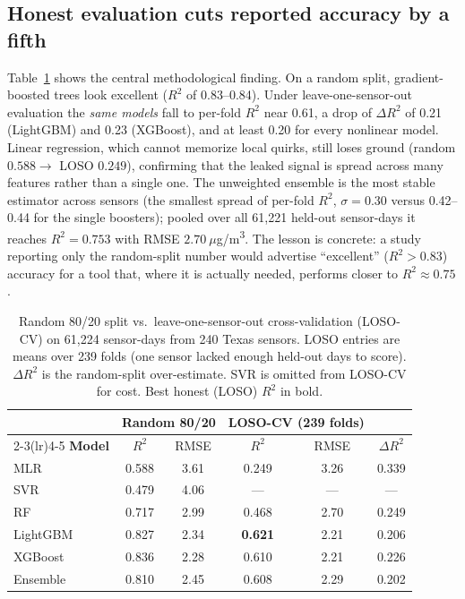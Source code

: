 \documentclass{article}
\begin{document}
\subsection{Honest evaluation cuts reported accuracy by a fifth}
Table~\ref{tab:bench} shows the central methodological finding. On a random split, gradient-boosted trees look excellent ($R^2$ of 0.83--0.84). Under leave-one-sensor-out evaluation the \emph{same models} fall to per-fold $R^2$ near 0.61, a drop of $\Delta R^2$ of 0.21 (LightGBM) and 0.23 (XGBoost), and at least 0.20 for every nonlinear model. Linear regression, which cannot memorize local quirks, still loses ground (random $0.588 \rightarrow$ LOSO $0.249$), confirming that the leaked signal is spread across many features rather than a single one. The unweighted ensemble is the most stable estimator across sensors (the smallest spread of per-fold $R^2$, $\sigma{=}0.30$ versus 0.42--0.44 for the single boosters); pooled over all 61{,}221 held-out sensor-days it reaches $R^2{=}0.753$ with RMSE $2.70~\mu$g/m\textsuperscript{3}. The lesson is concrete: a study reporting only the random-split number would advertise ``excellent'' ($R^2{>}0.83$) accuracy for a tool that, where it is actually needed, performs closer to $R^2 \approx 0.75$.

\begin{table}[t]
\caption{Random 80/20 split vs.\ leave-one-sensor-out cross-validation (LOSO-CV) on 61{,}224 sensor-days from 240 Texas sensors. LOSO entries are means over 239 folds (one sensor lacked enough held-out days to score). $\Delta R^2$ is the random-split over-estimate. SVR is omitted from LOSO-CV for cost. Best honest (LOSO) $R^2$ in bold.}
\label{tab:bench}
\centering
\small
\setlength{\tabcolsep}{6pt}
\begin{tabular}{lccccc}
\toprule
& \multicolumn{2}{c}{\textbf{Random 80/20}} & \multicolumn{2}{c}{\textbf{LOSO-CV (239 folds)}} & \\
\cmidrule(lr){2-3}\cmidrule(lr){4-5}
\textbf{Model} & $R^2$ & RMSE & $R^2$ & RMSE & $\Delta R^2$ \\
\midrule
MLR       & 0.588 & 3.61 & 0.249 & 3.26 & 0.339 \\
SVR       & 0.479 & 4.06 & ---   & ---  & ---   \\
RF        & 0.717 & 2.99 & 0.468 & 2.70 & 0.249 \\
LightGBM  & 0.827 & 2.34 & \textbf{0.621} & 2.21 & 0.206 \\
XGBoost   & 0.836 & 2.28 & 0.610 & 2.21 & 0.226 \\
Ensemble  & 0.810 & 2.45 & 0.608 & 2.29 & 0.202 \\
\bottomrule
\end{tabular}
\end{table}
\end{document}
